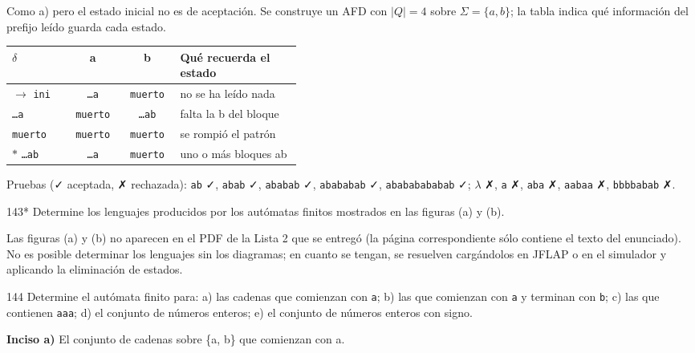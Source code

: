 \documentclass[11pt]{article}
\begin{document}
Como a) pero el estado inicial no es de aceptación. Se construye un AFD con $|Q| = 4$ sobre $\Sigma = \{a, b\}$; la tabla indica qué información del prefijo leído guarda cada estado.
\begin{center}\small\begin{tabular}{lccp{0.42\linewidth}}\toprule
$\delta$ & a & b & Qué recuerda el estado \\\midrule
$\to$ \texttt{ini} & \texttt{…a} & \texttt{muerto} & no se ha leído nada \\
 \texttt{…a} & \texttt{muerto} & \texttt{…ab} & falta la b del bloque \\
 \texttt{muerto} & \texttt{muerto} & \texttt{muerto} & se rompió el patrón \\
$*$ \texttt{…ab} & \texttt{…a} & \texttt{muerto} & uno o más bloques ab \\
\bottomrule\end{tabular}\end{center}
Pruebas (✓ aceptada, ✗ rechazada): \texttt{ab} ✓, \texttt{abab} ✓, \texttt{ababab} ✓, \texttt{abababab} ✓, \texttt{abababababab} ✓; $\lambda$ ✗, \texttt{a} ✗, \texttt{aba} ✗, \texttt{aabaa} ✗, \texttt{bbbbabab} ✗.



\begin{ejercicio}{143}{*}
Determine los lenguajes producidos por los autómatas finitos mostrados en las figuras (a) y (b).
\end{ejercicio}
\proc Las figuras (a) y (b) no aparecen en el PDF de la Lista 2 que se entregó (la página correspondiente sólo contiene el texto del enunciado).
\resp No es posible determinar los lenguajes sin los diagramas; en cuanto se tengan, se resuelven cargándolos en JFLAP o en el simulador y aplicando la eliminación de estados.


\begin{ejercicio}{144}{}
Determine el autómata finito para: a) las cadenas que comienzan con \texttt{a}; b) las que comienzan con \texttt{a} y terminan con \texttt{b}; c) las que contienen \texttt{aaa}; d) el conjunto de números enteros; e) el conjunto de números enteros con signo.
\end{ejercicio}
\proc 

\textbf{Inciso a)} El conjunto de cadenas sobre \{a, b\} que comienzan con a.
\end{document}
